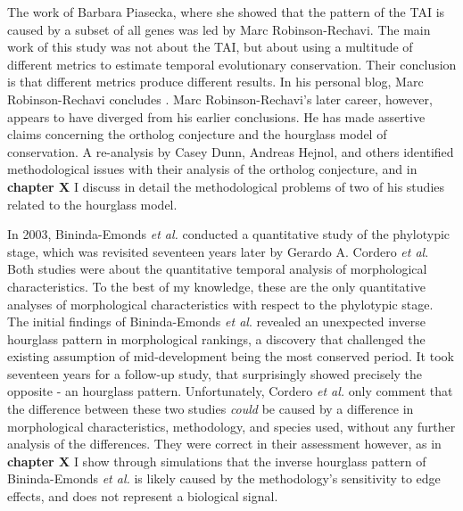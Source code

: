 The work of Barbara Piasecka, where she showed that the pattern of the TAI is caused by a subset of all genes was led by Marc Robinson-Rechavi. The main work of this study was not about the TAI, but about using a multitude of different metrics to estimate temporal evolutionary conservation. Their conclusion is that different metrics produce different results. In his personal blog, Marc Robinson-Rechavi concludes \cite{robinsonrechaviblog}. Marc Robinson-Rechavi's later career, however, appears to have diverged from his earlier conclusions. He has made assertive claims concerning the ortholog conjecture\cite{KryuchkovaMostacci2016} and the hourglass model of conservation\cite{Liu2020,Liu2021,marletaz2018}. A re-analysis by Casey Dunn, Andreas Hejnol, and others identified methodological issues with their analysis of the ortholog conjecture\cite{Dunn2018}, and in \textbf{chapter X} I discuss in detail the methodological problems of two of his studies related to the hourglass model.

In 2003, Bininda-Emonds \textit{et al.} conducted a quantitative study of the phylotypic stage, which was revisited seventeen years later by Gerardo A. Cordero \textit{et al}\cite{OlafRP2003, Cordero2020}. Both studies were about the quantitative temporal analysis of morphological characteristics. To the best of my knowledge, these are the only quantitative analyses of morphological characteristics with respect to the phylotypic stage. The initial findings of Bininda-Emonds \textit{et al}. revealed an unexpected inverse hourglass pattern in morphological rankings, a discovery that challenged the existing assumption of mid-development being the most conserved period. It took seventeen years for a follow-up study, that surprisingly showed precisely the opposite - an hourglass pattern. Unfortunately, Cordero \textit{et al.} only comment that the difference between these two studies \textit{could} be caused by a difference in morphological characteristics, methodology, and species used, without any further analysis of the differences. They were correct in their assessment however, as in \textbf{chapter X} I show through simulations that the inverse hourglass pattern of Bininda-Emonds \textit{et al.} is likely caused by the methodology's sensitivity to edge effects, and does not represent a biological signal.

